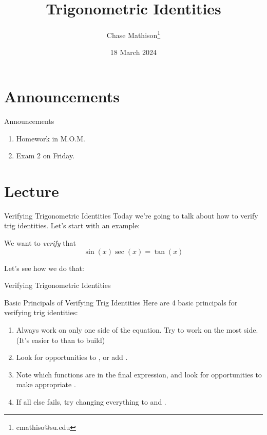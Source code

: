 \documentclass[presentation]{beamer}
\institute[SU]{Shenandoah University}
\author{Chase Mathison\thanks{cmathiso@su.edu}}
\date{18 March 2024}
\title{Trigonometric Identities}
\begin{document}
\maketitle

\section{Announcements}
\label{sec:org9267c3d}
\begin{frame}[label={sec:org917eb12}]{Announcements}
\begin{enumerate}
\item Homework in M.O.M.
\item Exam 2 on Friday.
\end{enumerate}
\end{frame}

\section{Lecture}
\label{sec:org6bfa320}
\begin{frame}[label={sec:org6c198f2}]{Verifying Trigonometric Identities}
Today we're going to talk about how to verify trig identities.  Let's start with an example:

We want to \emph{verify} that
\[
\sin(x)\sec(x) = \tan(x)\]

Let's see how we do that:
\vspace{10in}
\end{frame}

\begin{frame}[label={sec:orgf4131d9}]{Verifying Trigonometric Identities}
\end{frame}

\begin{frame}[label={sec:org65a4282}]{Basic Principals of Verifying Trig Identities}
Here are 4 basic principals for verifying trig identities:
\begin{enumerate}
\item Always work on only one side of the equation.  Try to work on the most \uline{\hspace*{1in}} side. (It's easier to \uline{\hspace*{1in}} than to build)
\item Look for opportunities to \uline{\hspace*{1in}}, \uline{\hspace*{1in}} or add \uline{\hspace*{1in}}.
\item Note which functions are in the final expression, and look for opportunities to make appropriate \uline{\hspace*{1in}}.
\item If all else fails, try changing everything to \uline{\hspace*{1in}} and \uline{\hspace*{1in}}.
\end{enumerate}
\end{frame}
\end{document}
